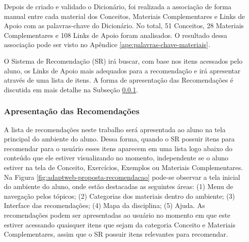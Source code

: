 Depois de criado e validado o Dicionário, foi realizada a associação de forma manual entre cada material dos Conceitos,
Materiais Complementares e Links de Apoio com as palavras-chave do Dicionário. No total, 51 Conceitos, 28 Materiais
Complementares e 108 Links de Apoio foram analisados. O resultado dessa associação pode ser visto no Apêndice \ref{ape:palavras-chave-materiais}.

O Sistema de Recomendação (SR) irá buscar, com base nos itens acessados pelo aluno, os Links de Apoio mais adequados
para a recomendação e irá apresentar através de uma lista de itens. A forma de apresentação das Recomendações é discutida
em mais detalhe na Subseção \ref{subsection:apresentacao-recomendacoes}.

\subsubsection{Apresentação das Recomendações}\label{subsection:apresentacao-recomendacoes}

A lista de recomendações neste trabalho será apresentada ao aluno na tela principal do ambiente do aluno. Dessa forma,
quando o SR possuir itens para recomendar para o usuário esses itens aparecem em uma lista logo abaixo do conteúdo que
ele estiver visualizando no momento, independente se o aluno estiver na tela de Conceito, Exercícios, Exemplos ou
Materiais Complementares. Na Figura \ref{fig:adaptweb-proposta-recomendacao} pode-se observar a tela inicial do ambiente do
aluno, onde estão destacadas as seguintes áreas: (1) Menu de navegação pelos tópicos; (2) Categorias dos materiais dentro
do ambiente; (3) Interface das recomendações; (4) Mapa da disciplina; (5) Ajuda. As recomendações podem ser apresentadas ao usuário no momento em que este estiver acessando
quaisquer itens que sejam da categoria Conceito e Materiais Complementares, assim que o SR possuir itens relevantes para recomendar.

